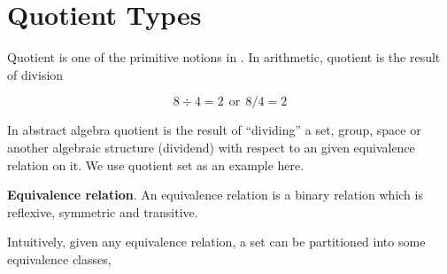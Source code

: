 \chapter{Quotient Types}
\label{qt}













Quotient is one of the primitive notions in \maths. 
In arithmetic, quotient is the result of division

$$8 \div 4 = 2 ~~ \text{or}~~ 8/4 = 2$$


In abstract algebra quotient is the result of ``dividing'' a set, group, space or another algebraic structure (dividend) with respect to an given equivalence relation on it. We use quotient set as an example here.

\begin{definition}
\textbf{Equivalence relation}.
An equivalence relation is a binary
relation which is reflexive, symmetric and transitive.
\end{definition}

Intuitively, given any equivalence relation, a set can be partitioned into
some equivalence classes,

